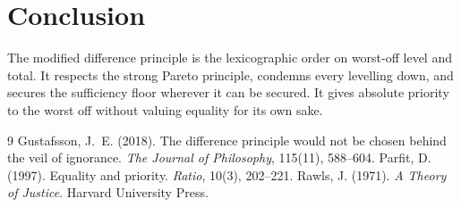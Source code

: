 \documentclass{situationist-preprint}
\begin{document}
\section{Conclusion}

The modified difference principle is the lexicographic order on worst-off level and total. It respects the strong Pareto principle, condemns every levelling down, and secures the sufficiency floor wherever it can be secured. It gives absolute priority to the worst off without valuing equality for its own sake.

\begin{thebibliography}{9}
 Gustafsson, J.~E. (2018). The difference principle would not be chosen behind the veil of ignorance. \emph{The Journal of Philosophy}, 115(11), 588--604.
 Parfit, D. (1997). Equality and priority. \emph{Ratio}, 10(3), 202--221.
 Rawls, J. (1971). \emph{A Theory of Justice}. Harvard University Press.
\end{thebibliography}
\end{document}
